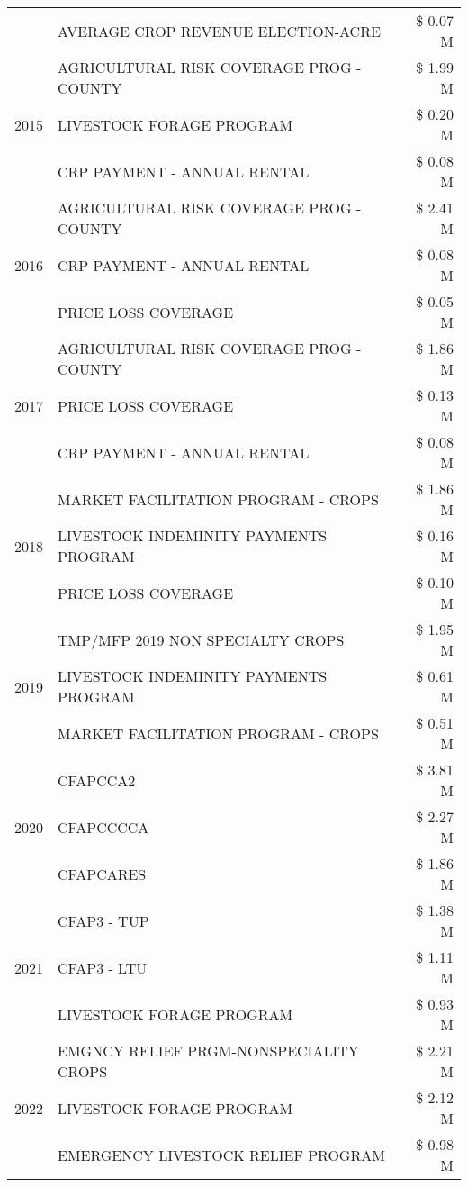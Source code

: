 \begin{tabular}{llr}
 & AVERAGE CROP REVENUE ELECTION-ACRE & \$ 0.07 M \\
\cline{1-3}
\multirow[t]{3}{*}{2015} & AGRICULTURAL RISK COVERAGE PROG - COUNTY & \$ 1.99 M \\
 & LIVESTOCK FORAGE PROGRAM & \$ 0.20 M \\
 & CRP PAYMENT - ANNUAL RENTAL & \$ 0.08 M \\
\cline{1-3}
\multirow[t]{3}{*}{2016} & AGRICULTURAL RISK COVERAGE PROG - COUNTY & \$ 2.41 M \\
 & CRP PAYMENT - ANNUAL RENTAL & \$ 0.08 M \\
 & PRICE LOSS COVERAGE & \$ 0.05 M \\
\cline{1-3}
\multirow[t]{3}{*}{2017} & AGRICULTURAL RISK COVERAGE PROG - COUNTY & \$ 1.86 M \\
 & PRICE LOSS COVERAGE & \$ 0.13 M \\
 & CRP PAYMENT - ANNUAL RENTAL & \$ 0.08 M \\
\cline{1-3}
\multirow[t]{3}{*}{2018} & MARKET FACILITATION PROGRAM - CROPS & \$ 1.86 M \\
 & LIVESTOCK INDEMINITY PAYMENTS PROGRAM & \$ 0.16 M \\
 & PRICE LOSS COVERAGE & \$ 0.10 M \\
\cline{1-3}
\multirow[t]{3}{*}{2019} & TMP/MFP 2019 NON SPECIALTY CROPS & \$ 1.95 M \\
 & LIVESTOCK INDEMINITY PAYMENTS PROGRAM & \$ 0.61 M \\
 & MARKET FACILITATION PROGRAM - CROPS & \$ 0.51 M \\
\cline{1-3}
\multirow[t]{3}{*}{2020} & CFAPCCA2 & \$ 3.81 M \\
 & CFAPCCCCA & \$ 2.27 M \\
 & CFAPCARES & \$ 1.86 M \\
\cline{1-3}
\multirow[t]{3}{*}{2021} & CFAP3 - TUP & \$ 1.38 M \\
 & CFAP3 - LTU & \$ 1.11 M \\
 & LIVESTOCK FORAGE PROGRAM & \$ 0.93 M \\
\cline{1-3}
\multirow[t]{3}{*}{2022} & EMGNCY RELIEF PRGM-NONSPECIALITY CROPS & \$ 2.21 M \\
 & LIVESTOCK FORAGE PROGRAM & \$ 2.12 M \\
 & EMERGENCY LIVESTOCK RELIEF PROGRAM & \$ 0.98 M \\
\cline{1-3}
\bottomrule
\end{tabular}
